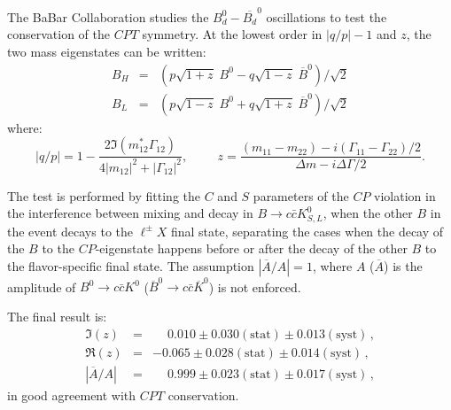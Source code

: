 The BaBar Collaboration studies the $B_d^0-\overline{B_d}^0$ oscillations to
test the conservation of the $CPT$ symmetry\cite{babar_cpt}. At the lowest order in $|q/p|-1$
and $z$, the two mass eigenstates can be written:
\begin{eqnarray}
B_H & = & (p\sqrt{1+z} \; B^0 - q\sqrt{1-z} \; \overline{B}^0) / \sqrt{2} \\
B_L & = & (p\sqrt{1-z} \; B^0 + q\sqrt{1+z} \; \overline{B}^0) / \sqrt{2} 
\end{eqnarray}
where:
\begin{equation}
  |q/p| = 1 - \frac{2 \Im(m_{12}^* \Gamma_{12})}{4|m_{12}|^2 + |\Gamma_{12}|^2}, \hspace{1cm}
  z = \frac{(m_{11}-m_{22}) - i (\Gamma_{11} - \Gamma_{22})/2}{\Delta m - i \Delta \Gamma /2}.
\end{equation}

The test is performed by fitting the $C$ and $S$ parameters of the $CP$ violation in the
interference between mixing and decay in $B \to c\bar{c} K^0_{S,L}$, when the other $B$
in the event decays to the $\ell^{\pm}X$ final state, separating the cases when the decay
of the $B$ to the $CP$-eigenstate happens before or after the decay of the other $B$ to
the flavor-specific final state. The assumption $|\overline{A}/A|=1$, where $A$ ($\overline{A}$)
is the amplitude of $B^0 \to c\bar{c} K^0$ ($\overline{B}^0 \to c\bar{c} \overline{K}^0$) is
not enforced.

The final result is:
\begin{eqnarray}
  \Im (z) & = &\phantom{-} 0.010 \pm 0.030 (\mbox{stat}) \pm 0.013 (\mbox{syst}) \, ,\\
  \Re (z) & = & -0.065 \pm 0.028 (\mbox{stat}) \pm 0.014 (\mbox{syst}) \, ,\\
  |\overline{A}/{A}| & = & \phantom{-} 0.999 \pm 0.023 (\mbox{stat}) \pm 0.017 (\mbox{syst}) \, ,
\end{eqnarray}
in good agreement with $CPT$ conservation.
  
